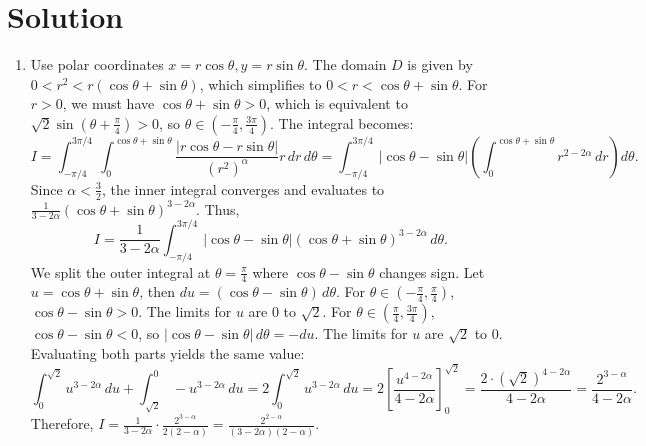 \documentclass{article}
\begin{document}
\section*{Solution}
\begin{enumerate}[label=\fbox{\arabic*}]
  \item %
        Use polar coordinates $x = r \cos \theta, y = r \sin \theta$. The domain $D$ is given by $0 < r^2 < r(\cos \theta + \sin \theta)$, which simplifies to $0 < r < \cos \theta + \sin \theta$.
        For $r > 0$, we must have $\cos \theta + \sin \theta > 0$, which is equivalent to $\sqrt{2} \sin(\theta + \frac{\pi}{4}) > 0$, so $\theta \in \left(-\frac{\pi}{4}, \frac{3\pi}{4}\right)$.
        The integral becomes:
        \[
          I = \int_{-\pi/4}^{3\pi/4} \int_0^{\cos \theta + \sin \theta} \frac{|r \cos \theta - r \sin \theta|}{(r^2)^\alpha} r \, dr \, d\theta = \int_{-\pi/4}^{3\pi/4} |\cos \theta - \sin \theta| \left( \int_0^{\cos \theta + \sin \theta} r^{2-2\alpha} \, dr \right) d\theta.
        \]
        Since $\alpha < \frac{3}{2}$, the inner integral converges and evaluates to $\frac{1}{3-2\alpha} (\cos \theta + \sin \theta)^{3-2\alpha}$. Thus,
        \[
          I = \frac{1}{3-2\alpha} \int_{-\pi/4}^{3\pi/4} |\cos \theta - \sin \theta| (\cos \theta + \sin \theta)^{3-2\alpha} \, d\theta.
        \]
        We split the outer integral at $\theta = \frac{\pi}{4}$ where $\cos \theta - \sin \theta$ changes sign. Let $u = \cos \theta + \sin \theta$, then $du = (\cos \theta - \sin \theta) \, d\theta$.
        For $\theta \in \left(-\frac{\pi}{4}, \frac{\pi}{4}\right)$, $\cos \theta - \sin \theta > 0$. The limits for $u$ are $0$ to $\sqrt{2}$.
        For $\theta \in \left(\frac{\pi}{4}, \frac{3\pi}{4}\right)$, $\cos \theta - \sin \theta < 0$, so $|\cos \theta - \sin \theta| \, d\theta = -du$. The limits for $u$ are $\sqrt{2}$ to $0$.
        Evaluating both parts yields the same value:
        \[
          \int_0^{\sqrt{2}} u^{3-2\alpha} \, du + \int_{\sqrt{2}}^0 -u^{3-2\alpha} \, du = 2 \int_0^{\sqrt{2}} u^{3-2\alpha} \, du = 2 \left[ \frac{u^{4-2\alpha}}{4-2\alpha} \right]_0^{\sqrt{2}} = \frac{2 \cdot (\sqrt{2})^{4-2\alpha}}{4-2\alpha} = \frac{2^{3-\alpha}}{4-2\alpha}.
        \]
        Therefore, $I = \frac{1}{3-2\alpha} \cdot \frac{2^{3-\alpha}}{2(2-\alpha)} = \frac{2^{2-\alpha}}{(3-2\alpha)(2-\alpha)}$.


\end{enumerate}
\end{document}
